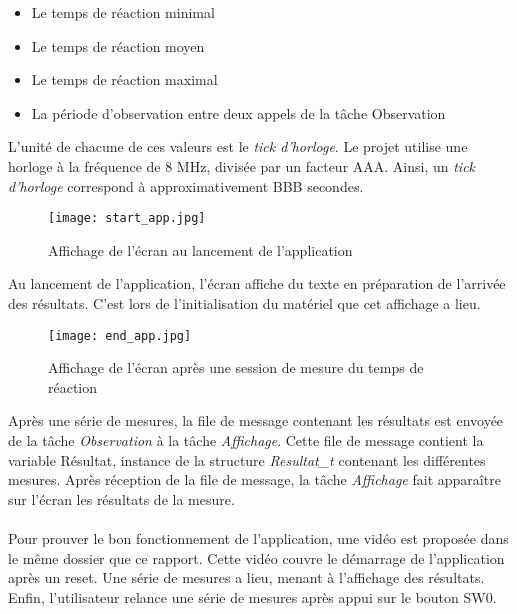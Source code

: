 \begin{itemize}
    \item Le temps de réaction minimal
    \item Le temps de réaction moyen
    \item Le temps de réaction maximal
    \item La période d'observation entre deux appels de la tâche Observation
\end{itemize}

L'unité de chacune de ces valeurs est le \textit{tick d'horloge}.
Le projet utilise une horloge à la fréquence de 8 MHz, divisée par un facteur AAA.
Ainsi, un \textit{tick d'horloge} correspond à approximativement BBB secondes.

\begin{figure}[h]
    \centering
    \texttt{[image: start\_app.jpg]}
    \caption{Affichage de l'écran au lancement de l'application}
    \label{fig:start_app}
\end{figure}

Au lancement de l'application, l'écran affiche du texte en préparation de l'arrivée des résultats.
C'est lors de l'initialisation du matériel que cet affichage a lieu.

\begin{figure}[h]
    \centering
    \texttt{[image: end\_app.jpg]}
    \caption{Affichage de l'écran après une session de mesure du temps de réaction}
    \label{fig:end_app}
\end{figure}

Après une série de mesures, la file de message contenant les résultats est envoyée de la tâche \textit{Observation} à la tâche \textit{Affichage}.
Cette file de message contient la variable Résultat, instance de la structure \textit{Resultat\_t} contenant les différentes mesures.
Après réception de la file de message, la tâche \textit{Affichage} fait apparaître sur l'écran les résultats de la mesure.
\\\\
Pour prouver le bon fonctionnement de l'application, une vidéo est proposée dans le même dossier que ce rapport.
Cette vidéo couvre le démarrage de l'application après un reset. 
Une série de mesures a lieu, menant à l'affichage des résultats.
Enfin, l'utilisateur relance une série de mesures après appui sur le bouton SW0.